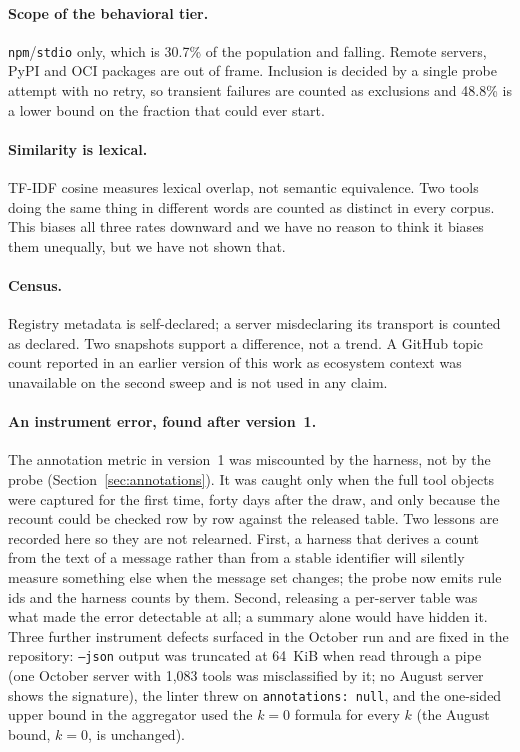 \documentclass[11pt]{article}
\begin{document}
\paragraph{Scope of the behavioral tier.}
\texttt{npm}/\texttt{stdio} only, which is 30.7\% of the population and falling.
Remote servers, PyPI and OCI packages are out of frame. Inclusion is decided by a
single probe attempt with no retry, so transient failures are counted as
exclusions and 48.8\% is a lower bound on the fraction that could ever start.

\paragraph{Similarity is lexical.}
TF-IDF cosine measures lexical overlap, not semantic equivalence. Two tools doing
the same thing in different words are counted as distinct in every corpus. This
biases all three rates downward and we have no reason to think it biases them
unequally, but we have not shown that.

\paragraph{Census.}
Registry metadata is self-declared; a server misdeclaring its transport is counted
as declared. Two snapshots support a difference, not a trend. A GitHub topic count
reported in an earlier version of this work as ecosystem context was unavailable
on the second sweep and is not used in any claim.

\paragraph{An instrument error, found after version~1.}
The annotation metric in version~1 was miscounted by the harness, not by the
probe (Section~\ref{sec:annotations}). It was caught only when the full tool
objects were captured for the first time, forty days after the draw, and only
because the recount could be checked row by row against the released table. Two
lessons are recorded here so they are not relearned. First, a harness that derives
a count from the text of a message rather than from a stable identifier will
silently measure something else when the message set changes; the probe now emits
rule ids and the harness counts by them. Second, releasing a per-server table was
what made the error detectable at all; a summary alone would have hidden it.
Three further instrument defects surfaced in the October run and are fixed in the
repository: \texttt{--json} output was truncated at 64~KiB when read through a
pipe (one October server with 1{,}083 tools was misclassified by it; no August
server shows the signature), the linter threw on \texttt{annotations: null}, and
the one-sided upper bound in the aggregator used the $k=0$ formula for every $k$
(the August bound, $k=0$, is unchanged).
\end{document}
